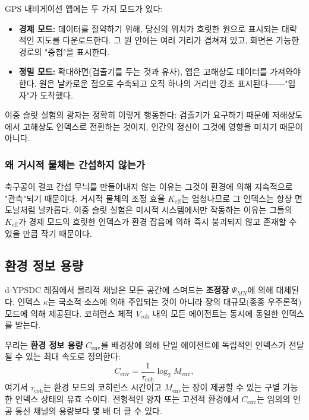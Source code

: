 \documentclass[12pt,a4paper]{article}
\begin{document}
	GPS 내비게이션 앱에는 두 가지 모드가 있다:
	\begin{itemize}
		\item \textbf{경제 모드:} 데이터를 절약하기 위해, 당신의 위치가 흐릿한 원으로 표시되는 대략적인 지도를 다운로드한다. 그 원 안에는 여러 거리가 겹쳐져 있고, 화면은 가능한 경로의 "중첩"을 표시한다.
		\item \textbf{정밀 모드:} 확대하면(검출기를 두는 것과 유사), 앱은 고해상도 데이터를 가져와야 한다. 원은 날카로운 점으로 수축되고 오직 하나의 거리만 강조 표시된다——"입자"가 도착했다.
	\end{itemize}
	이중 슬릿 실험의 광자는 정확히 이렇게 행동한다: 검출기가 요구하기 때문에 저해상도에서 고해상도 인덱스로 전환하는 것이지, 인간의 정신이 그것에 영향을 미치기 때문이 아니다.
	
	\subsubsection{왜 거시적 물체는 간섭하지 않는가}
	
	축구공이 결코 간섭 무늬를 만들어내지 않는 이유는 그것이 환경에 의해 지속적으로 "관측"되기 때문이다. 거시적 물체의 조정 효율 $K_{\mathrm{eff}}$는 엄청나므로 그 인덱스는 항상 면도날처럼 날카롭다. 이중 슬릿 실험은 미시적 시스템에서만 작동하는 이유는 그들의 $K_{\mathrm{eff}}$가 경제 모드의 흐릿한 인덱스가 환경 잡음에 의해 즉시 붕괴되지 않고 존재할 수 있을 만큼 작기 때문이다.
	
	\subsection{환경 정보 용량}
	\label{subsec:env-capacity}
	
	d-YPSDC 레짐에서 물리적 채널은 모든 공간에 스며드는 \textbf{조정장} $\Psi_{MN}$에 의해 대체된다. 인덱스 $\kappa$는 국소적 소스에 의해 주입되는 것이 아니라 장의 대규모(종종 우주론적) 모드에 의해 제공된다. 코히런스 체적 $V_{\mathrm{coh}}$ 내의 모든 에이전트는 동시에 동일한 인덱스를 받는다.
	
	우리는 \textbf{환경 정보 용량} $C_{\mathrm{env}}$를 배경장에 의해 단일 에이전트에 독립적인 인덱스가 전달될 수 있는 최대 속도로 정의한다:
	\begin{equation}
		C_{\mathrm{env}} = \frac{1}{\tau_{\mathrm{coh}}} \log_2 M_{\mathrm{env}},
		\label{eq:Cenv}
	\end{equation}
	여기서 $\tau_{\mathrm{coh}}$는 환경 모드의 코히런스 시간이고 $M_{\mathrm{env}}$는 장이 제공할 수 있는 구별 가능한 인덱스 상태의 유효 수이다. 전형적인 양자 또는 고전적 환경에서 $C_{\mathrm{env}}$는 임의의 인공 통신 채널의 용량보다 몇 배 더 클 수 있다.
	
\end{document}
